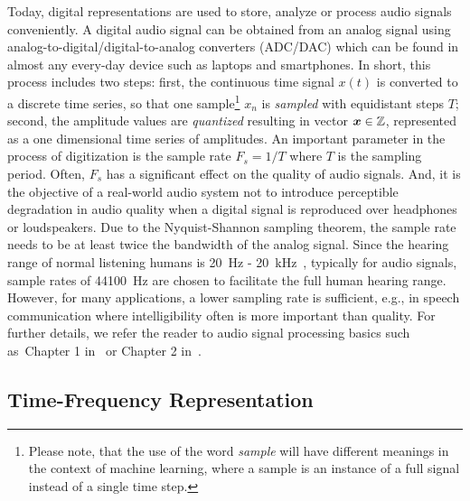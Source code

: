 Today, digital representations are used to store, analyze or process audio signals conveniently.
A digital audio signal can be obtained from an analog signal using analog-to-digital/digital-to-analog converters (ADC/DAC) which can be found in almost any every-day device such as laptops and smartphones.
In short, this process includes two steps: first, the continuous time signal \(x(t)\) is converted to a discrete time series, so that one sample\footnote{Please note, that the use of the word \emph{sample} will have different meanings in the context of machine learning, where a sample is an instance of a full signal instead of a single time step.} \(x_n\) is \emph{sampled} with equidistant steps \(T\); second, the amplitude values are \emph{quantized} resulting in vector \({\bm{x}} \in {\mathbb{Z}}\), represented as a one dimensional time series of amplitudes.
An important parameter in the process of digitization is the sample rate \(F_s = 1/T\) where \(T\) is the sampling period.
Often, \(F_s\) has a significant effect on the quality of audio signals.
And, it is the objective of a real-world audio system not to introduce perceptible degradation in audio quality when a digital signal is reproduced over headphones or loudspeakers.
Due to the Nyquist-Shannon sampling theorem, the sample rate needs to be at least twice the bandwidth of the analog signal.
Since the hearing range of normal listening humans is 20~\si{\hertz} - 20~\si{\kilo\hertz}~\cite{fastl90, moore89}, typically for audio signals, 
sample rates of 44100~\si{\hertz} are chosen to facilitate the full human hearing range.
However, for many applications, a lower sampling rate is sufficient, e.g., in speech communication where intelligibility often is more important than quality.
For further details, we refer the reader to audio signal processing basics such as~Chapter 1 in~\cite{proakis96} or Chapter 2 in~\cite{Mueller15}.

\hypertarget{time-frequency-representation}{%
\subsection{Time-Frequency Representation}\label{sub:time-frequency-representation}}

